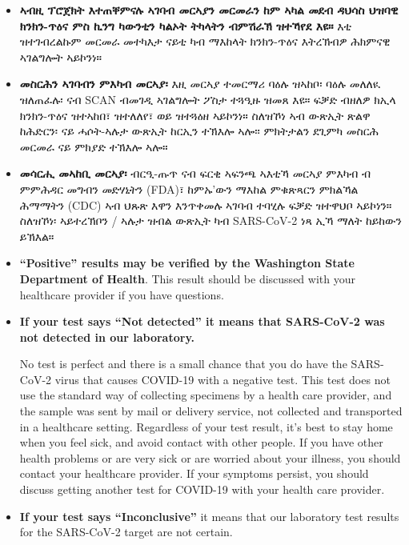 \documentclass[10pt]{article}
\begin{document}
\begin{itemize}
\item

  \textbf{ኣብዚ ፕሮጀክት እተጠቐምናሉ ኣገባብ መርኣያን መርመራን ከም ኣካል መደብ ዳህሳስ ህዝባዊ ክንክን-ጥዕና
  ምስ ኪንግ ካውንቲን ካልኦት ትካላትን ብምሽራኽ ዝተኻየደ እዩ።} እቲ ዝተገብረልኩም መርመራ መተካእታ ናይቲ ካብ
  ማእከላት ክንክን-ጥዕና እትረኽብዎ ሕክምናዊ ኣገልግሎት ኣይኮንነ።

\item

  \textbf{መስርሕን ኣገባብን ምእካብ መርኣያ፡} እዚ መርኣያ ተመርማሪ ባዕሉ ዝኣከቦ፡ ባዕሉ መለለዪ ዝለጠፈሉ፡ ናብ
  SCAN ብመገዲ ኣገልግሎት ፖስታ ተጓዒዙ ዝመጸ እዩ። ፍቓድ ብዘለዎ ክኢላ ክንክን-ጥዕና ዝተኣከበ፣ ዝተለለየ፣ ወይ
  ዝተጓዕዘ ኣይኮንነ። ስለዝኾነ ኣብ ውጽኢት ጽልዋ ከሕድርን፡ ናይ ሓሶት-ኣሉታ ውጽኢት ከርኢን ተኽእሎ ኣሎ፡፡
  ምክትታልን ደጊምካ መስርሕ መርመራ ናይ ምክያድ ተኽእሎ ኣሎ።

\item

  \textbf{መሳርሒ መኣከቢ መርኣያ፡} ብርዒ-ጡጥ ናብ ፍርቂ ኣፍንጫ ኣእቲኻ መርኣያ ምእካብ ብ ምምሕዳር
  መግብን መድሃኒትን (FDA)፣ ከምኡ’ውን ማእከል ምቁጽጻርን ምክልኻል ሕማማትን (CDC) ኣብ ህጹጽ እዋን
  እንጥቀመሉ ኣገባብ ተባሂሉ ፍቓድ ዝተዋህቦ ኣይኮነን። ስለዝኾነ፡ ኣይተረኽቦን / ኣሉታ ዝብል ውጽኢት ካብ
  SARS-CoV-2 ነጻ ኢኻ ማለት ከይከውን ይኽእል።

\item

  \textbf{``Positive'' results may be verified by the Washington State
  Department of Health}. This result should be discussed with your
  healthcare provider if you have questions.

\item{
  \textbf{If your test says ``Not detected'' it means that SARS-CoV-2
    was not detected in our laboratory.}

  No test is perfect and there is a small chance that you do have the
  SARS-CoV-2 virus that causes COVID-19 with a negative test. This test
  does not use the standard way of collecting specimens by a health care
  provider, and the sample was sent by mail or delivery service, not collected and transported
  in a healthcare setting. Regardless of your test result, it's best to
  stay home when you feel sick, and avoid contact with other people. If
  you have other health problems or are very sick or are worried about
  your illness, you should contact your healthcare provider. If your
  symptoms persist, you should discuss getting another test for COVID-19
  with your health care provider.
}

\item

  \textbf{If your test says ``Inconclusive''} it means that our
  laboratory test results for the SARS-CoV-2 target are not certain.


\end{itemize}
\end{document}
